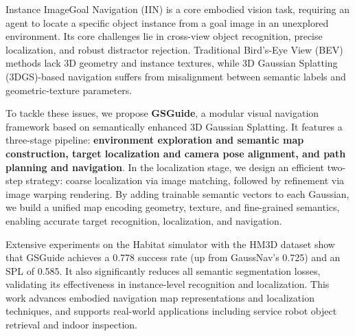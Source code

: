 Instance ImageGoal Navigation (IIN) is a core embodied vision task, requiring an agent to locate a specific object instance from a goal image in an unexplored environment. Its core challenges lie in cross-view object recognition, precise localization, and robust distractor rejection. Traditional Bird's-Eye View (BEV) methods lack 3D geometry and instance textures, while 3D Gaussian Splatting (3DGS)-based navigation suffers from misalignment between semantic labels and geometric-texture parameters.

To tackle these issues, we propose \textbf{GSGuide}, a modular visual navigation framework based on semantically enhanced 3D Gaussian Splatting. It features a three-stage pipeline:\textbf{ environment exploration and semantic map construction, target localization and camera pose alignment, and path planning and navigation}. In the localization stage, we design an efficient two-step strategy: coarse localization via image matching, followed by refinement via image warping rendering. By adding trainable semantic vectors to each Gaussian, we build a unified map encoding geometry, texture, and fine-grained semantics, enabling accurate target recognition, localization, and navigation.

Extensive experiments on the Habitat simulator with the HM3D dataset show that GSGuide achieves a 0.778 success rate (up from GaussNav's 0.725) and an SPL of 0.585. It also significantly reduces all semantic segmentation losses, validating its effectiveness in instance-level recognition and localization. This work advances embodied navigation map representations and localization techniques, and supports real-world applications including service robot object retrieval and indoor inspection.

